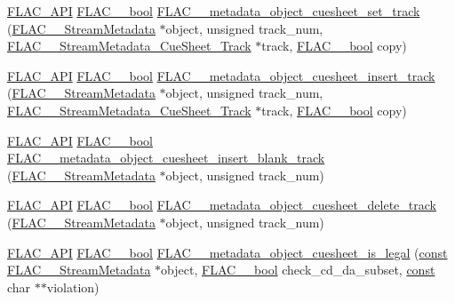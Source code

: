 \begin{DoxyCompactItemize}
\item 
\hyperlink{group__flac__export_ga56ca07df8a23310707732b1c0007d6f5}{F\+L\+A\+C\+\_\+\+A\+PI} \hyperlink{ordinals_8h_a95103469f1cbd78b8cf250194985b34e}{F\+L\+A\+C\+\_\+\+\_\+bool} \hyperlink{group__flac__metadata__object_ga682176f845b99956b3974bcc1bb63a20}{F\+L\+A\+C\+\_\+\+\_\+metadata\+\_\+object\+\_\+cuesheet\+\_\+set\+\_\+track} (\hyperlink{struct_f_l_a_c_____stream_metadata}{F\+L\+A\+C\+\_\+\+\_\+\+Stream\+Metadata} $\ast$object, unsigned track\+\_\+num, \hyperlink{struct_f_l_a_c_____stream_metadata___cue_sheet___track}{F\+L\+A\+C\+\_\+\+\_\+\+Stream\+Metadata\+\_\+\+Cue\+Sheet\+\_\+\+Track} $\ast$track, \hyperlink{ordinals_8h_a95103469f1cbd78b8cf250194985b34e}{F\+L\+A\+C\+\_\+\+\_\+bool} copy)
\item 
\hyperlink{group__flac__export_ga56ca07df8a23310707732b1c0007d6f5}{F\+L\+A\+C\+\_\+\+A\+PI} \hyperlink{ordinals_8h_a95103469f1cbd78b8cf250194985b34e}{F\+L\+A\+C\+\_\+\+\_\+bool} \hyperlink{group__flac__metadata__object_ga5dbdffac2cd7e327f711103c15e015ac}{F\+L\+A\+C\+\_\+\+\_\+metadata\+\_\+object\+\_\+cuesheet\+\_\+insert\+\_\+track} (\hyperlink{struct_f_l_a_c_____stream_metadata}{F\+L\+A\+C\+\_\+\+\_\+\+Stream\+Metadata} $\ast$object, unsigned track\+\_\+num, \hyperlink{struct_f_l_a_c_____stream_metadata___cue_sheet___track}{F\+L\+A\+C\+\_\+\+\_\+\+Stream\+Metadata\+\_\+\+Cue\+Sheet\+\_\+\+Track} $\ast$track, \hyperlink{ordinals_8h_a95103469f1cbd78b8cf250194985b34e}{F\+L\+A\+C\+\_\+\+\_\+bool} copy)
\item 
\hyperlink{group__flac__export_ga56ca07df8a23310707732b1c0007d6f5}{F\+L\+A\+C\+\_\+\+A\+PI} \hyperlink{ordinals_8h_a95103469f1cbd78b8cf250194985b34e}{F\+L\+A\+C\+\_\+\+\_\+bool} \hyperlink{group__flac__metadata__object_ga87855591d933cd6371010a675f0bc629}{F\+L\+A\+C\+\_\+\+\_\+metadata\+\_\+object\+\_\+cuesheet\+\_\+insert\+\_\+blank\+\_\+track} (\hyperlink{struct_f_l_a_c_____stream_metadata}{F\+L\+A\+C\+\_\+\+\_\+\+Stream\+Metadata} $\ast$object, unsigned track\+\_\+num)
\item 
\hyperlink{group__flac__export_ga56ca07df8a23310707732b1c0007d6f5}{F\+L\+A\+C\+\_\+\+A\+PI} \hyperlink{ordinals_8h_a95103469f1cbd78b8cf250194985b34e}{F\+L\+A\+C\+\_\+\+\_\+bool} \hyperlink{group__flac__metadata__object_ga3232bae96f19722bee19afd37fdc214d}{F\+L\+A\+C\+\_\+\+\_\+metadata\+\_\+object\+\_\+cuesheet\+\_\+delete\+\_\+track} (\hyperlink{struct_f_l_a_c_____stream_metadata}{F\+L\+A\+C\+\_\+\+\_\+\+Stream\+Metadata} $\ast$object, unsigned track\+\_\+num)
\item 
\hyperlink{group__flac__export_ga56ca07df8a23310707732b1c0007d6f5}{F\+L\+A\+C\+\_\+\+A\+PI} \hyperlink{ordinals_8h_a95103469f1cbd78b8cf250194985b34e}{F\+L\+A\+C\+\_\+\+\_\+bool} \hyperlink{group__flac__metadata__object_ga1160f85e437c1a763ec0a8f372cb1390}{F\+L\+A\+C\+\_\+\+\_\+metadata\+\_\+object\+\_\+cuesheet\+\_\+is\+\_\+legal} (\hyperlink{zconf_8h_a2c212835823e3c54a8ab6d95c652660e}{const} \hyperlink{struct_f_l_a_c_____stream_metadata}{F\+L\+A\+C\+\_\+\+\_\+\+Stream\+Metadata} $\ast$object, \hyperlink{ordinals_8h_a95103469f1cbd78b8cf250194985b34e}{F\+L\+A\+C\+\_\+\+\_\+bool} check\+\_\+cd\+\_\+da\+\_\+subset, \hyperlink{zconf_8h_a2c212835823e3c54a8ab6d95c652660e}{const} char $\ast$$\ast$violation)
$$
\end{DoxyCompactItemize}
